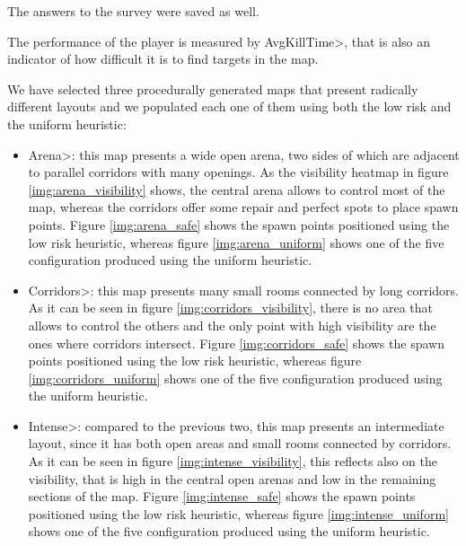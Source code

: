 \noindent
The answers to the survey were saved as well.
 
 \par
 
The performance of the player is measured by \<AvgKillTime>, that is also an indicator of how difficult it is to find targets in the map.

\par
  
We have selected three procedurally generated maps that present radically different layouts and we populated each one of them using both the low risk and the uniform heuristic:

\begin{itemize}
\item \<Arena>: this map presents a wide open arena, two sides of which are adjacent to parallel corridors with many openings. As the visibility heatmap in figure \ref{img:arena_visibility} shows, the central arena allows to control most of the map, whereas the corridors offer some repair and perfect spots to place spawn points. Figure \ref{img:arena_safe} shows the spawn points positioned using the low risk heuristic, whereas figure \ref{img:arena_uniform} shows one of the five configuration produced using the uniform heuristic.
\item \<Corridors>: this map presents many small rooms connected by long corridors. As it can be seen in figure \ref{img:corridors_visibility}, there is no area that allows to control the others and the only point with high visibility are the ones where corridors intersect. Figure \ref{img:corridors_safe} shows the spawn points positioned using the low risk heuristic, whereas figure \ref{img:corridors_uniform} shows one of the five configuration produced using the uniform heuristic.
\item \<Intense>: compared to the previous two, this map presents an intermediate layout, since it has both open areas and small rooms connected by corridors. As it can be seen in figure \ref{img:intense_visibility}, this reflects also on the visibility, that is high in the central open arenas and low in the remaining sections of the map. Figure \ref{img:intense_safe} shows the spawn points positioned using the low risk heuristic, whereas figure \ref{img:intense_uniform} shows one of the five configuration produced using the uniform heuristic.
\end{itemize}

